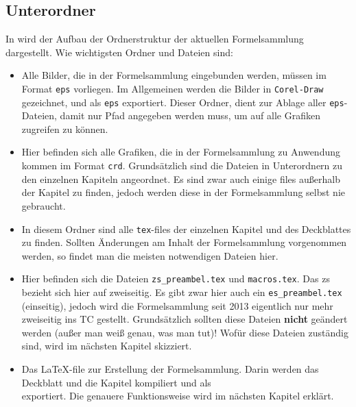 \subsection{Unterordner }
In  wird der Aufbau der Ordnerstruktur der aktuellen
Formelsammlung dargestellt. Wie wichtigsten Ordner und Dateien sind:

\begin{itemize}
  \item {} Alle Bilder, die in der Formelsammlung eingebunden
    werden, müssen im Format {\tt eps} vorliegen. Im Allgemeinen werden die
    Bilder in {\tt Corel-Draw} gezeichnet, und als {\tt eps} exportiert. Dieser
    Ordner, dient zur Ablage aller {\tt eps}-Dateien, damit nur Pfad angegeben
    werden muss, um auf alle Grafiken zugreifen zu können.
  \item {} Hier befinden sich alle Grafiken, die
    in der Formelsammlung zu Anwendung kommen im Format {\tt crd}. 
    Grundsätzlich sind die Dateien in Unterordnern zu den einzelnen Kapiteln
    angeordnet. Es sind zwar auch einige files außerhalb der Kapitel zu finden,
    jedoch werden diese in der Formelsammlung selbst nie gebraucht.
  \item {} In diesem Ordner sind alle {\tt tex}-files der
    einzelnen Kapitel und des Deckblattes zu finden. Sollten Änderungen
    am Inhalt der Formelsammlung vorgenommen werden, so findet man die meisten
    notwendigen Dateien hier.
  \item {} Hier befinden sich die Dateien {\tt zs\_preambel.tex}
    und {\tt macros.tex}. Das \glqq{}zs\grqq{} bezieht sich hier auf 
    \glqq{}zweiseitig\grqq{}. Es gibt zwar hier auch ein {\tt es\_preambel.tex}
    (\glqq{}einseitig\grqq{}), jedoch wird die Formelsammlung seit 2013 
    eigentlich nur mehr zweiseitig ins TC gestellt. Grundsätzlich sollten diese
    Dateien {\bf nicht} geändert werden (außer man weiß genau, was man tut)!
    Wofür diese Dateien zuständig sind, wird im nächsten Kapitel skizziert.
  \item {} Das \LaTeX-file zur
    Erstellung der Formelsammlung. Darin werden das Deckblatt und die Kapitel
    kompiliert und als \\
    exportiert. Die genauere Funktionsweise wird im nächsten Kapitel erklärt.
\end{itemize}

